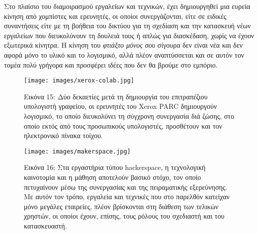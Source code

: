 \documentclass[
]{article}
\begin{document}
Στο πλαίσιο του διαμοιρασμού εργαλείων και τεχνικών, έχει δημιουργηθεί
μια ευρεία κίνηση από χομπίστες και ερευνητές, οι οποίοι συνεργάζονται,
είτε σε ειδικές συναντήσεις είτε με τη βοήθεια του δικτύου για τη
σχεδίαση και την κατασκευή νέων εργαλείων που διευκολύνουν τη δουλειά
τους ή απλώς για διασκέδαση, χωρίς να έχουν εξωτερικά κίνητρα. Η κίνηση
του \emph{φτιάξτο μόνος σου} σίγουρα δεν είναι νέα και δεν αφορά μόνο το
υλικό και το λογισμικό, αλλά πλέον αναπτύσσεται και σε αυτόν τον τομέα
πολύ γρήγορα και προσφέρει ιδέες που δεν θα βρούμε στο εμπόριο.

\leavevmode{}%
\begin{figure}
\hypertarget{fig:xerox-colab}{%
\centering
\texttt{[image: images/xerox-colab.jpg]}
\caption{Εικόνα 15: Δύο δεκαετίες μετά τη δημιουργία του επιτραπέζιου
υπολογιστή γραφείου, οι ερευνητές του Xerox PARC δημιουργούν λογισμικό,
το οποίο διευκολύνει τη σύγχρονη συνεργασία διά ζώσης, στο οποίο εκτός
από τους προσωπικούς υπολογιστές, προσθέτουν και τον ηλεκτρονικό πίνακα
τοίχου.}\label{fig:xerox-colab}
}
\end{figure}

\leavevmode{}%
\begin{figure}
\hypertarget{fig:makerspace}{%
\centering
\texttt{[image: images/makerspace.jpg]}
\caption{Εικόνα 16: Στα εργαστήρια τύπου hackerspace, η τεχνολογική
καινοτομία και η μάθηση αποτελούν βασικό στόχο, τον οποίο πετυχαίνουν
μέσω της συνεργασίας και της πειραματικής εξερεύνησης. Με αυτόν τον
τρόπο, εργαλεία και τεχνικές που στο παρελθόν κατείχαν μόνο μεγάλες
εταιρείες, πλέον βρίσκονται στη διάθεση των τελικών χρηστών, οι οποίοι
έχουν, επίσης, τους ρόλους του σχεδιαστή και του
κατασκευαστή.}\label{fig:makerspace}
}
\end{figure}
\end{document}
